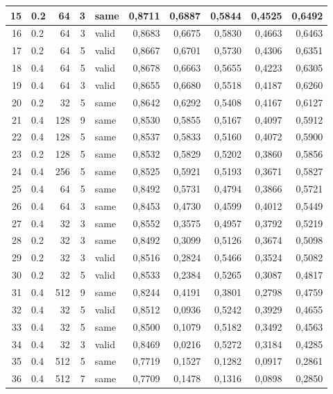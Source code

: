 \begin{table}[H]
\begin{center}
{\begin{tabular}{|r|l|r|r|l|r|r|r|r|r|}
        15 & 0.2 & 64 & 3 & same & 0,8711 & 0,6887 & 0,5844 & 0,4525 & 0,6492 \\ \hline
        16 & 0.2 & 64 & 3 & valid & 0,8683 & 0,6675 & 0,5830 & 0,4663 & 0,6463 \\ \hline
        17 & 0.2 & 64 & 5 & valid & 0,8667 & 0,6701 & 0,5730 & 0,4306 & 0,6351 \\ \hline
        18 & 0.4 & 64 & 5 & valid & 0,8678 & 0,6663 & 0,5655 & 0,4223 & 0,6305 \\ \hline
        19 & 0.4 & 64 & 3 & valid & 0,8655 & 0,6680 & 0,5518 & 0,4187 & 0,6260 \\ \hline
        20 & 0.2 & 32 & 5 & same & 0,8642 & 0,6292 & 0,5408 & 0,4167 & 0,6127 \\ \hline
        21 & 0.4 & 128 & 9 & same & 0,8530 & 0,5855 & 0,5167 & 0,4097 & 0,5912 \\ \hline
        22 & 0.4 & 128 & 5 & same & 0,8537 & 0,5833 & 0,5160 & 0,4072 & 0,5900 \\ \hline
        23 & 0.2 & 128 & 5 & same & 0,8532 & 0,5829 & 0,5202 & 0,3860 & 0,5856 \\ \hline
        24 & 0.4 & 256 & 5 & same & 0,8525 & 0,5921 & 0,5193 & 0,3671 & 0,5827 \\ \hline
        25 & 0.4 & 64 & 5 & same & 0,8492 & 0,5731 & 0,4794 & 0,3866 & 0,5721 \\ \hline
        26 & 0.4 & 64 & 3 & same & 0,8453 & 0,4730 & 0,4599 & 0,4012 & 0,5449 \\ \hline
        27 & 0.4 & 32 & 3 & same & 0,8552 & 0,3575 & 0,4957 & 0,3792 & 0,5219 \\ \hline
        28 & 0.2 & 32 & 3 & same & 0,8492 & 0,3099 & 0,5126 & 0,3674 & 0,5098 \\ \hline
        29 & 0.2 & 32 & 3 & valid & 0,8516 & 0,2824 & 0,5466 & 0,3524 & 0,5082 \\ \hline
        30 & 0.2 & 32 & 5 & valid & 0,8533 & 0,2384 & 0,5265 & 0,3087 & 0,4817 \\ \hline
        31 & 0.4 & 512 & 9 & same & 0,8244 & 0,4191 & 0,3801 & 0,2798 & 0,4759 \\ \hline
        32 & 0.4 & 32 & 5 & valid & 0,8512 & 0,0936 & 0,5242 & 0,3929 & 0,4655 \\ \hline
        33 & 0.4 & 32 & 5 & same & 0,8500 & 0,1079 & 0,5182 & 0,3492 & 0,4563 \\ \hline
        34 & 0.4 & 32 & 3 & valid & 0,8469 & 0,0216 & 0,5272 & 0,3184 & 0,4285 \\ \hline
        35 & 0.4 & 512 & 5 & same & 0,7719 & 0,1527 & 0,1282 & 0,0917 & 0,2861 \\ \hline
        36 & 0.4 & 512 & 7 & same & 0,7709 & 0,1478 & 0,1316 & 0,0898 & 0,2850 \\ \hline
        \end{tabular}
        }
        \end{center}
        \label{table:model1_result}
        \end{table}


